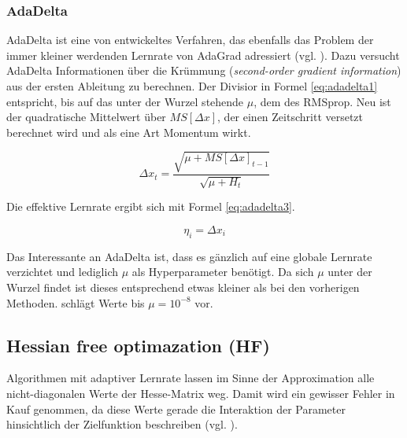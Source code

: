 \subsubsection{AdaDelta}
AdaDelta ist eine von \cite{Zeiler2012} entwickeltes Verfahren, das ebenfalls das Problem der immer kleiner werdenden Lernrate von AdaGrad adressiert (vgl. \cite{Bengio2015}). Dazu versucht AdaDelta Informationen über die Krümmung (\textit{second-order gradient information}) aus der ersten Ableitung zu berechnen. Der Divisior in Formel \ref{eq:adadelta1} entspricht, bis auf das unter der Wurzel stehende $\mu$, dem des RMSprop. Neu ist der quadratische Mittelwert über $MS[\Delta x]$, der einen Zeitschritt versetzt berechnet wird und als eine Art Momentum wirkt.


\begin{equation}
\label{eq:adadelta1} 
\Delta x_{t} = \frac{\sqrt{\mu + MS[\Delta x]_{t-1} }}{\sqrt{\mu + H_{t}}} 
\end{equation}

Die effektive Lernrate ergibt sich mit Formel \ref{eq:adadelta3}.

\begin{equation}
\label{eq:adadelta3} 
 \eta_{i} = \Delta x_i
\end{equation}

Das Interessante an AdaDelta ist, dass es gänzlich auf eine globale Lernrate verzichtet und lediglich $\mu$ als Hyperparameter benötigt. Da sich $\mu$ unter der Wurzel findet ist dieses entsprechend etwas kleiner als bei den vorherigen Methoden. \cite{Zeiler2012} schlägt Werte bis $\mu = 10^{-8}$ vor.


\subsection{Hessian free optimazation (HF)}
\label{ch:hf}

Algorithmen mit adaptiver Lernrate lassen im Sinne der Approximation alle nicht-diagonalen Werte der Hesse-Matrix weg. Damit wird ein gewisser Fehler in Kauf genommen, da diese Werte gerade die Interaktion der Parameter hinsichtlich der Zielfunktion beschreiben (vgl. \cite{Martens2010}). 

